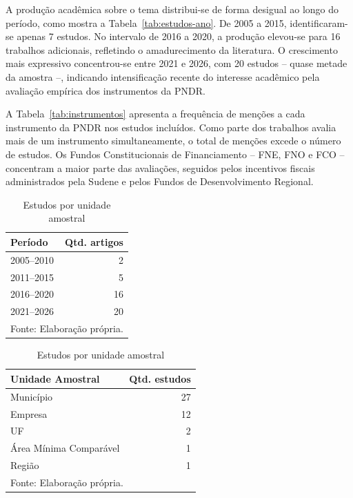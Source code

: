 A produção acadêmica sobre o tema distribui-se de forma desigual ao longo do período, como mostra a Tabela~\ref{tab:estudos-ano}. De 2005 a 2015, identificaram-se apenas 7 estudos. No intervalo de 2016 a 2020, a produção elevou-se para 16 trabalhos adicionais, refletindo o amadurecimento da literatura. O crescimento mais expressivo concentrou-se entre 2021 e 2026, com 20 estudos -- quase metade da amostra --, indicando intensificação recente do interesse acadêmico pela avaliação empírica dos instrumentos da PNDR.

A Tabela~\ref{tab:instrumentos} apresenta a frequência de menções a cada instrumento da PNDR nos estudos incluídos. Como parte dos trabalhos avalia mais de um instrumento simultaneamente, o total de menções excede o número de estudos. Os Fundos Constitucionais de Financiamento -- FNE, FNO e FCO -- concentram a maior parte das avaliações, seguidos pelos incentivos fiscais administrados pela Sudene e pelos Fundos de Desenvolvimento Regional.

\begin{table}[H]
\footnotesize
\renewcommand{\arraystretch}{1.2}
\centering
\begin{minipage}[t]{0.38\textwidth}
\centering
\caption{Estudos por período}
\label{tab:estudos-ano}
\begin{tabular}{lr}
\toprule
Período & Qtd. artigos \\
\midrule
2005--2010 & 2 \\
2011--2015 & 5 \\
2016--2020 & 16 \\
2021--2026 & 20 \\
\bottomrule
\multicolumn{2}{l}{\footnotesize Fonte: Elaboração própria.} \\
\end{tabular}
\end{minipage}
\hfill
\begin{minipage}[t]{0.58\textwidth}
\centering
\caption{Estudos por unidade amostral}
\label{tab:unidade-amostral}
\begin{tabular}{lr}
\toprule
Unidade Amostral & Qtd. estudos \\
\midrule
Município & 27 \\
Empresa & 12 \\
UF & 2 \\
Área Mínima Comparável & 1 \\
Região & 1 \\
\bottomrule
\multicolumn{2}{l}{\footnotesize Fonte: Elaboração própria.} \\
\end{tabular}
\end{minipage}
\end{table}


